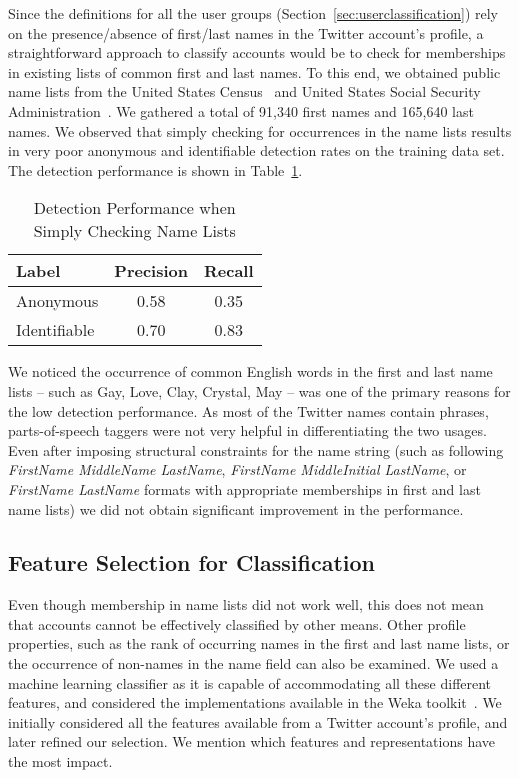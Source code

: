 \documentclass[conference]{IEEEtran}
\begin{document}
Since the definitions for all the user groups (Section~\ref{sec:userclassification}) rely on the presence/absence of first/last names in the Twitter account's profile, a straightforward approach to classify accounts would be to check for memberships in existing lists of common first and last names. To this end, we obtained public name lists from the United States Census~\cite{censusnamesdatabase} and 
United States Social Security Administration~\cite{ssanamesdatabase}. We gathered a total of 91,340 first names and 165,640 last names.
We observed that simply checking for occurrences in the name lists results in very poor anonymous and identifiable detection rates on the training data set. The detection performance is shown in Table~\ref{tab:namelistperformance}. 

\begin{table}[thbp]
\small
\begin{center}
\caption{Detection Performance when Simply Checking Name Lists}
\label{tab:namelistperformance}
\begin{tabular}{| l | c | c |}
\hline
\textbf{Label} & \textbf{Precision} & \textbf{Recall}\\
\hline
Anonymous & 0.58  & 0.35\\
\hline
Identifiable & 0.70 & 0.83\\
\hline  
\end{tabular}
\end{center}
\end{table}


We noticed the occurrence of common English words in the first and last name lists -- such as Gay, Love, Clay, Crystal, May -- was one of the primary reasons for the low detection performance.
As most of the Twitter names contain phrases, parts-of-speech taggers were not very helpful in differentiating the two usages. 
Even after imposing structural constraints for the name string (such as following \textit{FirstName MiddleName LastName}, \textit{FirstName MiddleInitial LastName}, or \textit{FirstName LastName} formats with appropriate memberships in first and last name lists) we did not obtain significant improvement in the performance.  

\subsection{Feature Selection for Classification}
\label{sec:featureselection}

Even though membership in name lists did not work well, this does not mean that accounts cannot be effectively classified by other means.  Other profile properties, such as the rank of occurring names in the first and last name lists, or the occurrence of non-names in the name field can also be examined. 
We used a machine learning classifier as it is capable of accommodating all these different features, and considered the implementations available in the Weka toolkit~\cite{weka}.
We initially considered all the features available from a Twitter account's profile, and later refined our selection. We mention which features and representations have the most impact.
\end{document}
